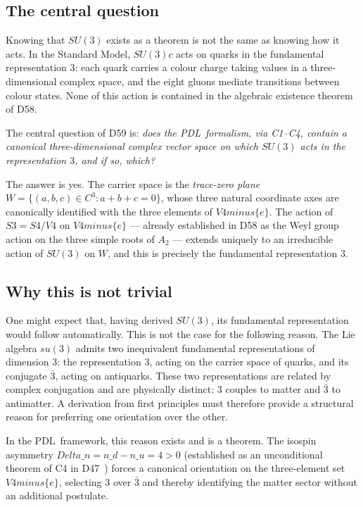 \documentclass[11pt,a4paper]{article}
\def\Sfour{S4}%
\def\Vfour{V4}%
\def\Sthree{S3}%
\def\SUthree{SU(3)}%
\def\SUthreec{SU(3)c}%
\def\PDL{PDL}%
\def\setminus{ minus }%
\def\mathbb#1{#1}%
\def\mathrm#1{#1}%
\def\mathfrak#1{#1}%
\def\mathbf#1{#1}%
\def\textsc#1{#1}%
\def\nuu{n\_u}%
\def\ndd{n\_d}%
\def\Dn{Delta\_n}%
\theoremstyle{plain}
\theoremstyle{definition}
\theoremstyle{remark}
\newcommand{\PDL}{\textsc{PDL}}
\newcommand{\Sfour}{S_4}
\newcommand{\Vfour}{V_4}
\newcommand{\Sthree}{S_3}
\newcommand{\SUthree}{\mathrm{SU}(3)}
\newcommand{\SUthreec}{\mathrm{SU}(3)_c}
\newcommand{\nuu}{n_u}
\newcommand{\ndd}{n_d}
\newcommand{\Dn}{\Delta n}
\newcommand{\suthree}{\mathfrak{su}(3)}
\begin{document}
\subsection{The central question}

Knowing that $\SUthree$ exists as a theorem is not the same as knowing how it acts. In the Standard Model, $\SUthreec$ acts on quarks in the fundamental representation $\mathbf{3}$: each quark carries a colour charge taking values in a three-dimensional complex space, and the eight gluons mediate transitions between colour states. None of this action is contained in the algebraic existence theorem of D58.

The central question of D59 is: \emph{does the \PDL\ formalism, via C1--C4, contain a canonical three-dimensional complex vector space on which $\SUthree$ acts in the representation $\mathbf{3}$, and if so, which?}

The answer is yes. The carrier space is the \emph{trace-zero plane} $W = \{(a,b,c)\in\mathbb{C}^3 : a+b+c = 0\}$, whose three natural coordinate axes are canonically identified with the three elements of $\Vfour \setminus\{e\}$. The action of $\Sthree = \Sfour/\Vfour$ on $\Vfour\setminus\{e\}$ --- already established in D58 as the Weyl group action on the three simple roots of $A_2$ --- extends uniquely to an irreducible action of $\SUthree$ on $W$, and this is precisely the fundamental representation $\mathbf{3}$.

\subsection{Why this is not trivial}

One might expect that, having derived $\SUthree$, its fundamental representation would follow automatically. This is not the case for the following reason. The Lie algebra $\suthree$ admits two inequivalent fundamental representations of dimension 3: the representation $\mathbf{3}$, acting on the carrier space of quarks, and its conjugate $\bar{\mathbf{3}}$, acting on antiquarks. These two representations are related by complex conjugation and are physically distinct: $\mathbf{3}$ couples to matter and $\bar{\mathbf{3}}$ to antimatter. A derivation from first principles must therefore provide a structural reason for preferring one orientation over the other.

In the \PDL\ framework, this reason exists and is a theorem. The isospin asymmetry $\Dn = \ndd - \nuu = 4 > 0$ (established as an unconditional theorem of C4 in D47~\cite{PDL_D47}) forces a canonical orientation on the three-element set $\Vfour \setminus \{e\}$, selecting $\mathbf{3}$ over $\bar{\mathbf{3}}$ and thereby identifying the matter sector without an additional postulate.
\end{document}
